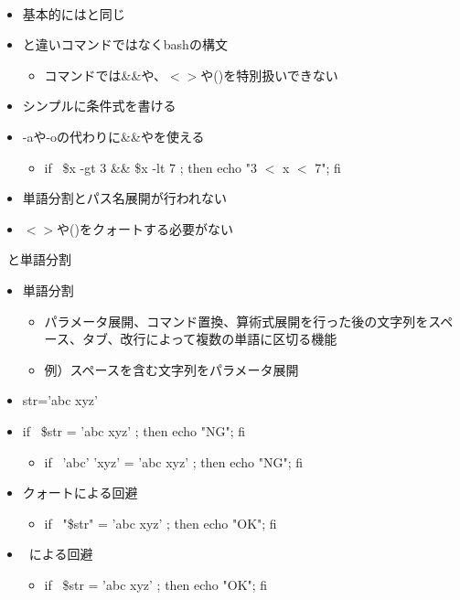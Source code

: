 \documentclass[12pt,aspectratio=169]{beamer}
\begin{document}
\begin{frame}{\lbrack\lbrack\ \rbrack\rbrack}

  \begin{itemize}
    \item 基本的には\lbrack と同じ
    \item \lbrack と違いコマンドではなくbashの構文
    \begin{itemize}
      \item コマンドでは\&\&や\textbar\textbar、$<>$や()を特別扱いできない
    \end{itemize}
    \item シンプルに条件式を書ける
    \item -aや-oの代わりに\&\&や\textbar\textbar を使える
    \begin{itemize}
      \item if \lbrack\lbrack\ \$x -gt 3 \&\& \$x -lt 7 \rbrack\rbrack ; then echo "3 $<$ x $<$ 7"; fi
    \end{itemize}
    \item 単語分割とパス名展開が行われない
    \item $<>$や()をクォートする必要がない
  \end{itemize}

\end{frame}

\begin{frame}{\lbrack\lbrack\ \rbrack\rbrack と単語分割}

  \begin{itemize}
    \item 単語分割
    \begin{itemize}
      \item パラメータ展開、コマンド置換、算術式展開を行った後の文字列をスペース、タブ、改行によって複数の単語に区切る機能
      \item 例）スペースを含む文字列をパラメータ展開
    \end{itemize}
    \item str='abc xyz'
    \item if \lbrack\ \$str = 'abc xyz' \rbrack ; then echo "NG"; fi
    \begin{itemize}
      \item if \lbrack\ 'abc' 'xyz' = 'abc xyz' \rbrack ; then echo "NG"; fi
    \end{itemize}
    \item クォートによる回避
    \begin{itemize}
      \item if \lbrack\ "\$str" = 'abc xyz' \rbrack ; then echo "OK"; fi
    \end{itemize}
    \item \lbrack\lbrack\ \rbrack\rbrack による回避
    \begin{itemize}
      \item if \lbrack\lbrack\ \$str = 'abc xyz' \rbrack\rbrack ; then echo "OK"; fi
    \end{itemize}
  \end{itemize}

\end{frame}
\end{document}
